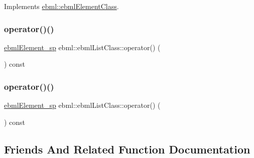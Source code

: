 Implements \mbox{\hyperlink{classebml_1_1ebmlElementClass_a223ede6b8bc3c85251d2d73f0256fb45}{ebml\+::ebml\+Element\+Class}}.

\mbox{\label{classebml_1_1ebmlListClass_a115d07c81b0433aaa0510134dabf0f66}} 
\subsubsection{\texorpdfstring{operator()()}{operator()()}\hspace{0.1cm}{\footnotesize\ttfamily [1/2]}}
{\footnotesize\ttfamily \mbox{\hyperlink{namespaceebml_adad533b7705a16bb360fe56380c5e7be}{ebml\+Element\+\_\+sp}} ebml\+::ebml\+List\+Class\+::operator() (\begin{DoxyParamCaption}\item[{const \mbox{\hyperlink{namespaceebml_a1ddadd26791f273d851882653b9caf70}{ebml\+Element\+\_\+l}} \&}]{ }\end{DoxyParamCaption}) const}

\mbox{\label{classebml_1_1ebmlListClass_a5a52d343c43baa7eeb837fb0ab660c07}} 
\subsubsection{\texorpdfstring{operator()()}{operator()()}\hspace{0.1cm}{\footnotesize\ttfamily [2/2]}}
{\footnotesize\ttfamily \mbox{\hyperlink{namespaceebml_adad533b7705a16bb360fe56380c5e7be}{ebml\+Element\+\_\+sp}} ebml\+::ebml\+List\+Class\+::operator() (\begin{DoxyParamCaption}\item[{\mbox{\hyperlink{namespaceebml_a1ddadd26791f273d851882653b9caf70}{ebml\+Element\+\_\+l}} \&\&}]{ }\end{DoxyParamCaption}) const}



\subsection{Friends And Related Function Documentation}
\mbox{\label{classebml_1_1ebmlListClass_af371b14231393d2eef62cb562cdd6e2d}} 

